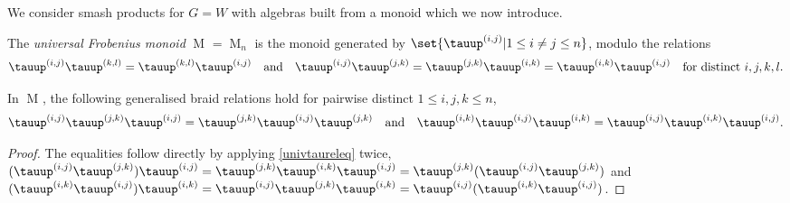 \documentclass[a4paper,11pt]{amsart}
\numberwithin{equation}{subsection}
\theoremstyle{definition}
\theoremstyle{theorem}
\theoremstyle{remark}
\newcommand\Sym{W}
\newcommand{\ttau}{\tauup}
\newcommand\nBraid{\operatorname{M}^{\operatorname{}}}
\begin{document}
  We consider smash products for $G=\Sym$ with
  algebras built from a monoid which we now  introduce.

   \begin{Definition}\label{univtaurel}
     The \emph{universal Frobenius monoid} $\nBraid=\nBraid_n$ is the
     monoid generated by $\set{\ttau^{(i,j)}|1\leq i\not=j\leq n}$,
     modulo the relations
   \begin{align}\label{univtaureleq}
    \ttau^{(i,j)}\ttau^{(k,l)}=\ttau^{(k,l)}\ttau^{(i,j)}\quad\text{and}\quad
   \ttau^{(i,j)}\ttau^{(j,k)}=\ttau^{(j,k)}\ttau^{(i,k)}=\ttau^{(i,k)}\ttau^{(i,j)}
   \quad\text{for distinct $i,j,k,l$}.
   \end{align}
   \end{Definition}

   \begin{Lemma}\label{braidlemma}
In $\nBraid$, the following generalised braid relations hold for pairwise distinct $1\leq i,j,k\leq n$,
 \begin{align*}
 \ttau^{(i,j)}\ttau^{(j,k)}\ttau^{(i,j)}=\ttau^{(j,k)}\ttau^{(i,j)}\ttau^{(j,k)}
 \quad\text{and}\quad
  \ttau^{(i,k)}\ttau^{(i,j)}\ttau^{(i,k)}=\ttau^{(i,j)}\ttau^{(i,k)}\ttau^{(i,j)}.
  \end{align*}

\end{Lemma}
\begin{proof} The equalities follow directly by applying \autoref{univtaureleq} twice, $ (\ttau^{(i,j)}\ttau^{(j,k)})\ttau^{(i,j)}=\ttau^{(j,k)}\ttau^{(i,k)}\ttau^{(i,j)}=\ttau^{(j,k)}(\ttau^{(i,j)}\ttau^{(j,k)})$ and $(\ttau^{(i,k)}\ttau^{(i,j)})\ttau^{(i,k)}=\ttau^{(i,j)}\ttau^{(j,k)}\ttau^{(i,k)}=\ttau^{(i,j)}(\ttau^{(i,k)}\ttau^{(i,j)})$.
\end{proof}
\end{document}
